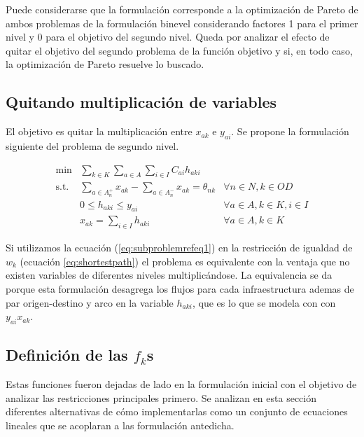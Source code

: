 \documentclass{article}
\begin{document}
  Puede considerarse que la formulación corresponde a la optimización de Pareto de ambos problemas de la formulación binevel considerando factores 1 para el primer nivel y 0 para el objetivo del segundo nivel. Queda por analizar el efecto de quitar el objetivo del segundo problema de la función objetivo y si, en todo caso, la optimización de Pareto resuelve lo buscado.

  \subsection*{Quitando multiplicación de variables}

  El objetivo es quitar la multiplicación entre $x_{ak}$ e $y_{ai}$. Se propone la formulación siguiente del problema de segundo nivel.

  \begin{align}
    \text{min}  & \sum_{k \in K} \sum_{a \in A} \sum_{i \in I} C_{ai} h_{aki}         & \label{eq:subproblemrefeq1} \\
    \text{s.t.} & \sum_{a \in A_n^+} x_{ak} - \sum_{a \in A_n^-} x_{ak} = \theta_{nk} & \forall n \in N, k \in OD \\
                & 0 \leq h_{aki} \leq y_{ai}                                          & \forall a \in A, k \in K, i \in I \\
                & x_{ak} = \sum_{i \in I} h_{aki}                                     & \forall a \in A, k \in K
  \end{align}

  Si utilizamos la ecuación (\ref{eq:subproblemrefeq1}) en la restricción de igualdad de $w_k$ (ecuación \ref{eq:shortestpath}) el problema es equivalente con la ventaja que no existen variables de diferentes niveles multiplicándose. La equivalencia se da porque esta formulación desagrega los flujos para cada infraestructura ademas de par origen-destino y arco en la variable $h_{aki}$, que es lo que se modela con con $y_{ai} x_{ak}$.

  \subsection*{Definición de las $f_k$s}

  Estas funciones fueron dejadas de lado en la formulación inicial con el objetivo de analizar las restricciones principales primero. Se analizan en esta sección diferentes alternativas de cómo implementarlas como un conjunto de ecuaciones lineales que se acoplaran a las formulación antedicha.
\end{document}
